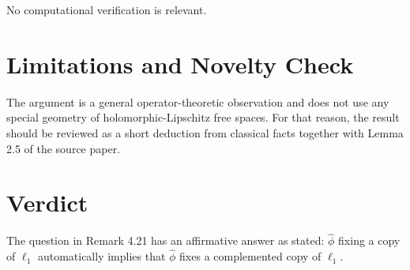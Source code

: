 \documentclass[11pt]{article}
\newcommand{\ellone}{\ell_1}
\begin{document}
No computational verification is relevant.

\section*{Limitations and Novelty Check}

The argument is a general operator-theoretic observation and does not use any
special geometry of holomorphic-Lipschitz free spaces. For that reason, the
result should be reviewed as a short deduction from classical facts together
with Lemma 2.5 of the source paper.

\section*{Verdict}

The question in Remark 4.21 has an affirmative answer as stated:
\(\widehat{\phi}\) fixing a copy of \(\ellone\) automatically implies that
\(\widehat{\phi}\) fixes a complemented copy of \(\ellone\).
\end{document}
